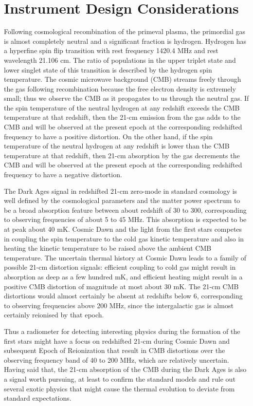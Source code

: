 \section{Instrument Design Considerations}

Following cosmological recombination of the primeval plasma, the primordial gas is almost completely neutral and a significant fraction is hydrogen.  Hydrogen has a hyperfine spin flip transition with rest frequency 1420.4 MHz and rest wavelength 21.106 cm.  The ratio of populations in the upper triplet state and lower singlet state of this transition is described by the hydrogen spin temperature.  The cosmic microwave background (CMB) streams freely through the gas following recombination because the free electron density is extremely small; thus we observe the CMB as it propagates to us through the neutral gas.   If the spin temperature of the neutral hydrogen at any redshift exceeds the CMB temperature at that redshift, then the 21-cm emission from the gas adds to the CMB and will be observed at the present epoch at the corresponding redshifted frequency to have a positive distortion.  On the other hand, if the spin temperature of the neutral hydrogen at any redshift is lower than the CMB temperature at that redshift, then 21-cm absorption by the gas decrements the CMB and will be observed at the present epoch at the corresponding redshifted frequency to have a negative distortion.

The Dark Ages signal in redshifted 21-cm zero-mode in standard cosmology is well defined by the cosmological parameters and the matter power spectrum to be a broad absorption feature between about redshift of 30 to 300, corresponding to observing frequencies of about 5 to 45 MHz. This absorption is expected to be at peak about 40 mK.  Cosmic Dawn and the light from the first stars competes in coupling the spin temperature to the cold gas kinetic temperature and also in heating the kinetic temperature to be raised above the ambient CMB temperature.  The uncertain thermal history at Cosmic Dawn leads to a family of possible 21-cm distortion signals: efficient coupling to cold gas might result in absorption as deep as a few hundred mK, and efficient heating might result in a positive CMB distortion of magnitude at most about 30 mK.  The 21-cm CMB distortions would almost certainly be absent at redshifts below 6, corresponding to observing frequencies above 200 MHz, since the intergalactic gas is almost certainly reionised by that epoch.  

Thus a radiometer for detecting interesting physics during the formation of the first stars might have a focus on redshifted 21-cm during Cosmic Dawn and subsequent Epoch of Reionization that result in CMB distortions over the observing frequency band of 40 to 200 MHz, which are relatively uncertain.  Having said that, the 21-cm absorption of the CMB during the Dark Ages is also a signal worth pursuing, at least to confirm the standard models and rule out several exotic physics that might cause the thermal evolution to deviate from standard expectations. 

